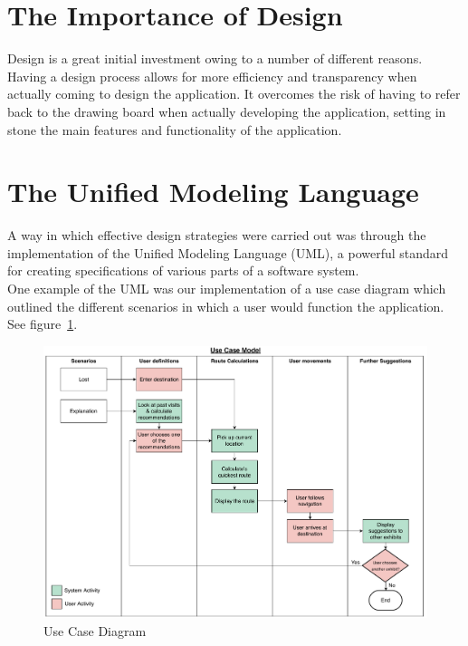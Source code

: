\section{The Importance of Design}

Design is a great initial investment owing to a number of different reasons. Having a design process allows for more efficiency and transparency when actually coming to design the application. It overcomes the risk of having to refer back to the drawing board when actually developing the application, setting in stone the main features and functionality of the application.

\section{The Unified Modeling Language}

A way in which effective design strategies were carried out was through the implementation of the Unified Modeling Language (UML), a powerful standard for creating specifications of various parts of a software system.\\

One example of the UML was our implementation of a use case diagram which outlined the different scenarios in which a user would function the application. See figure~\ref{fig:Use Case Diagram}.\\

\begin{figure}[H]
    \centering
    \includegraphics[width=\textwidth]
    {assets/use_case.pdf}
    \caption{Use Case Diagram}
    \label{fig:Use Case Diagram}
\end{figure}

